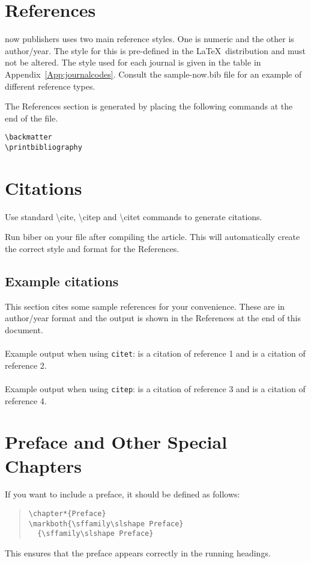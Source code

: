 \documentclass[examplefnt,biber]{nowfnt} %
\begin{document}
\section{References}
now publishers uses two main reference styles. One is numeric and the other is author/year.
The style for this is pre-defined in the  \LaTeX\ distribution and must not be altered. The style used for
each journal is given in the table in Appendix~\ref{App:journalcodes}.
Consult the sample-now.bib file for an example of different reference types. 

The References section is generated by placing the following commands at the 
end of the file.
\begin{verbatim}
\backmatter 
\printbibliography
\end{verbatim}

\section{Citations}
Use standard \textbackslash cite, \textbackslash citep and \textbackslash citet commands to generate
citations.

Run biber on your file after compiling the article. This will automatically create
the correct style and format for the References.

\subsection{Example citations}
This section cites some sample references for your convenience. These are in author/year format and
the output is shown in the References at the end of this document.\\
\\
\noindent Example output when using \texttt{citet}: 
\citet{arvolumenumber} is a citation of reference 1 and
\citet{report} is a citation of reference 2. \\
\\
\noindent Example output when using \texttt{citep}: 
\citep{beditorvolumenumber} is a citation of reference 3 and
\citep{inproceedings} is a citation of reference 4.


\section{Preface and Other Special Chapters}

If you want to include a preface, it should be defined as follows:
\begin{quote}
\begin{verbatim}
\chapter*{Preface}
\markboth{\sffamily\slshape Preface}
  {\sffamily\slshape Preface}
\end{verbatim}
\end{quote}
This ensures that the preface appears correctly in the running headings.
\end{document}
